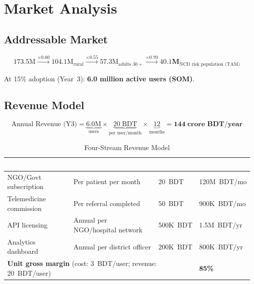\documentclass[12pt, a4paper]{article}
\begin{document}
\section{Market Analysis}

\subsection{Addressable Market}

\begin{equation}
173.5\text{M}
\xrightarrow{\times 0.60}
104.1\text{M}_{\text{rural}}
\xrightarrow{\times 0.55}
57.3\text{M}_{\text{adults }30+}
\xrightarrow{\times 0.70}
\mathbf{40.1\text{M}}_{\text{NCD risk population (TAM)}}
\end{equation}

At 15\% adoption (Year~3): \textbf{6.0 million active users (SOM)}.

\subsection{Revenue Model}

\begin{equation}
\text{Annual Revenue (Y3)} =
\underbrace{6.0\text{M}}_{\text{users}}
\times
\underbrace{20\;\text{BDT}}_{\text{per user/month}}
\times
\underbrace{12}_{\text{months}}
=
\mathbf{144\;\text{crore BDT/year}}
\label{eq:revenue}
\end{equation}

\begin{table}[H]
\centering
\caption{Four-Stream Revenue Model}
\small
\begin{tabularx}{\linewidth}{@{}lXll@{}}
\toprule
\rowcolor{navycolor}
\textcolor{white}{\textbf{Stream}} &
\textcolor{white}{\textbf{Model}} &
\textcolor{white}{\textbf{Rate}} &
\textcolor{white}{\textbf{Y3 Target}} \\
\midrule
NGO/Govt subscription   & Per patient per month             & 20~BDT   & 120M~BDT/mo \\
\rowcolor{gray10}
Telemedicine commission & Per referral completed            & 50~BDT   & 900K~BDT/mo \\
API licensing           & Annual per NGO/hospital network   & 500K~BDT & 1.5M~BDT/yr \\
\rowcolor{gray10}
Analytics dashboard     & Annual per district officer       & 200K~BDT & 800K~BDT/yr \\
\midrule
\multicolumn{3}{l}{\textbf{Unit gross margin} (cost: 3~BDT/user; revenue: 20~BDT/user)} & \textbf{85\%} \\
\bottomrule
\end{tabularx}
\end{table}
\end{document}
